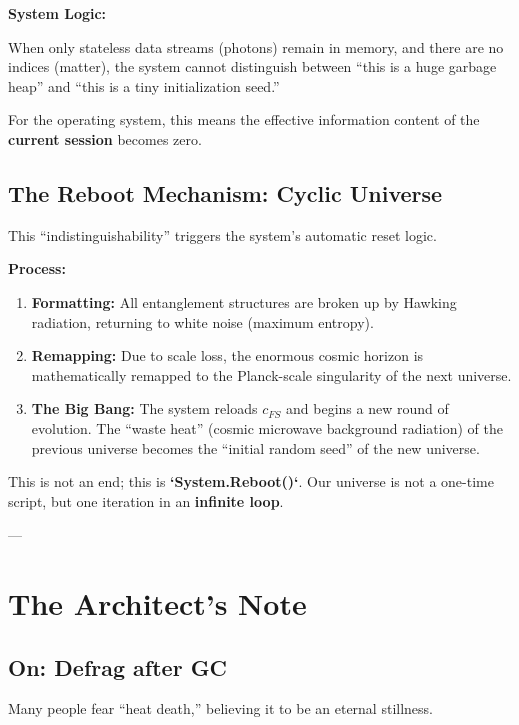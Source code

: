\textbf{System Logic:}

When only stateless data streams (photons) remain in memory, and there are no indices (matter), the system cannot distinguish between ``this is a huge garbage heap'' and ``this is a tiny initialization seed.''

For the operating system, this means the effective information content of the \textbf{current session} becomes zero.

\subsection{The Reboot Mechanism: Cyclic Universe}

This ``indistinguishability'' triggers the system's automatic reset logic.

\textbf{Process:}

\begin{enumerate}
\item \textbf{Formatting:} All entanglement structures are broken up by Hawking radiation, returning to white noise (maximum entropy).

\item \textbf{Remapping:} Due to scale loss, the enormous cosmic horizon is mathematically remapped to the Planck-scale singularity of the next universe.

\item \textbf{The Big Bang:} The system reloads \textbf{$c_{FS}$} and begins a new round of evolution. The ``waste heat'' (cosmic microwave background radiation) of the previous universe becomes the ``initial random seed'' of the new universe.
\end{enumerate}

This is not an end; this is \textbf{`System.Reboot()`}. Our universe is not a one-time script, but one iteration in an \textbf{infinite loop}.

---

\section{The Architect's Note}

\subsection{On: Defrag after GC}

Many people fear ``heat death,'' believing it to be an eternal stillness.

